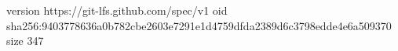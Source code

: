 version https://git-lfs.github.com/spec/v1
oid sha256:9403778636a0b782cbe2603e7291e1d4759dfda2389d6c3798edde4e6a509370
size 347

